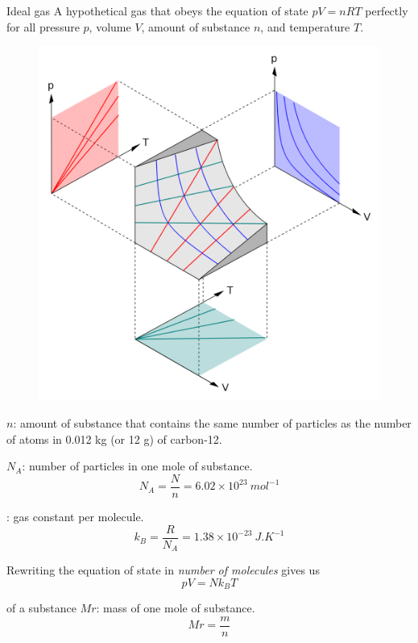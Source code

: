 \begin{defn}{Ideal gas}{}
A hypothetical gas that obeys the equation of state $pV=nRT$ perfectly for all pressure $p$, volume $V$, amount of substance $n$, and temperature $T$.
\end{defn}

\begin{figure}[H]
    \centering
    \includegraphics[width=14cm]{images/pVT-surface.png}
\end{figure}

 $n$: amount of substance that contains the same number of particles as the number of atoms in 0.012 kg (or 12 g) of carbon-12.

 $N_A$: number of particles in one mole of substance.
\[ N_A = \frac{N}{n} = 6.02 \times 10^{23} \: \unit{mol^{-1}} \]

: gas constant per molecule.
\[ k_B = \frac{R}{N_A} = 1.38\times10^{-23} \: \unit{J.K^{-1}} \]

Rewriting the equation of state in \emph{number of molecules} gives us
\begin{equation}
pV=Nk_BT
\end{equation}

 of a substance $Mr$: mass of one mole of substance.
\[ Mr = \frac{m}{n} \]

